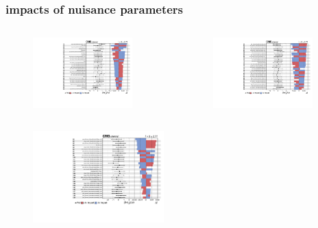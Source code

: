 \documentclass{beamer}
\begin{document}
\begin{frame}[label=impacts1]
\frametitle{impacts of nuisance parameters}
\vspace{-10pt}
\begin{columns}
	\begin{figure}
		\includegraphics[width=0.9\textwidth]{impacts2.pdf}
	\end{figure}
	\begin{figure}
		\includegraphics[width=0.9\textwidth]{impacts3.pdf}
	\end{figure}
\end{columns}
\vspace{-10pt}
\begin{figure}
	\includegraphics[width=0.45\textwidth]{impacts4.pdf}
\end{figure}
\end{frame}
\end{document}
